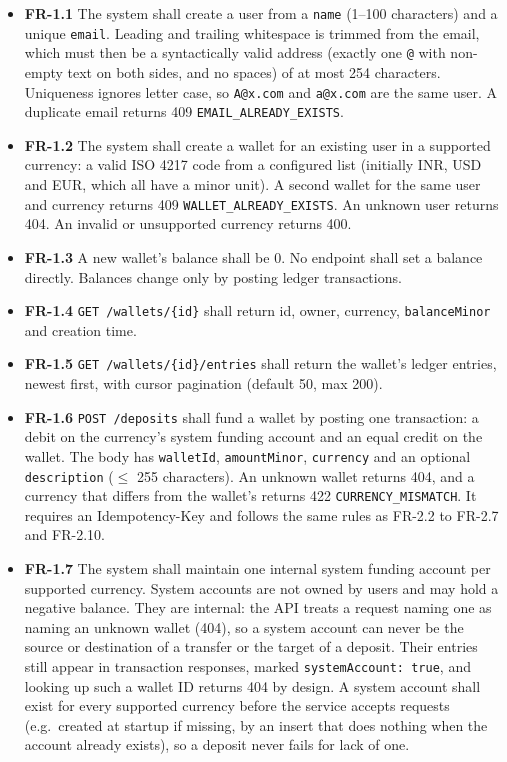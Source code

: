 \documentclass[11pt,a4paper]{article}
\providecommand{\tightlist}{\setlength{\itemsep}{2pt}\setlength{\parskip}{0pt}}
\begin{document}
\begin{itemize}
\tightlist
\item
  \textbf{FR-1.1} The system shall create a user from a \texttt{name} (1--100 characters) and a unique \texttt{email}.
  Leading and trailing whitespace is trimmed from the email, which must then be a syntactically
  valid address (exactly one \texttt{@} with non-empty text on both sides, and no spaces) of at most 254
  characters. Uniqueness ignores letter case, so \texttt{A@x.com} and
  \texttt{a@x.com} are the same user. A duplicate email returns 409 \texttt{EMAIL\_\allowbreak{}ALREADY\_\allowbreak{}EXISTS}.
\item
  \textbf{FR-1.2} The system shall create a wallet for an existing user in a supported currency: a
  valid ISO 4217 code from a configured list (initially INR, USD and EUR, which all have a minor
  unit). A second wallet for the same user and currency returns 409 \texttt{WALLET\_\allowbreak{}ALREADY\_\allowbreak{}EXISTS}. An
  unknown user returns 404. An invalid or unsupported currency returns 400.
\item
  \textbf{FR-1.3} A new wallet's balance shall be 0. No endpoint shall set a balance directly. Balances
  change only by posting ledger transactions.
\item
  \textbf{FR-1.4} \texttt{GET\ /\allowbreak{}wallets/\allowbreak{}\{id\}} shall return id, owner, currency, \texttt{balanceMinor} and creation
  time.
\item
  \textbf{FR-1.5} \texttt{GET\ /\allowbreak{}wallets/\allowbreak{}\{id\}/\allowbreak{}entries} shall return the wallet's ledger entries, newest first,
  with cursor pagination (default 50, max 200).
\item
  \textbf{FR-1.6} \texttt{POST\ /\allowbreak{}deposits} shall fund a wallet by posting one transaction: a debit on the
  currency's system funding account and an equal credit on the wallet. The body has \texttt{walletId},
  \texttt{amountMinor}, \texttt{currency} and an optional \texttt{description} (\ensuremath{\le} 255 characters). An unknown wallet
  returns 404, and a currency that differs from the wallet's returns 422 \texttt{CURRENCY\_\allowbreak{}MISMATCH}. It
  requires an Idempotency-Key and follows the same rules as FR-2.2 to FR-2.7 and FR-2.10.
\item
  \textbf{FR-1.7} The system shall maintain one internal system funding account per supported
  currency. System accounts are not owned by users and may hold a negative balance. They are
  internal: the API treats a request naming one as naming an unknown wallet (404), so a system
  account can never be the source or destination of a transfer or the target of a deposit. Their
  entries still appear in transaction responses, marked \texttt{systemAccount:\ true}, and looking up such
  a wallet ID returns 404 by design. A system account shall exist for every supported currency
  before the service accepts requests (e.g.~created at startup if missing, by an insert that does
  nothing when the account already exists), so a deposit never fails for lack of one.
\end{itemize}
\end{document}
